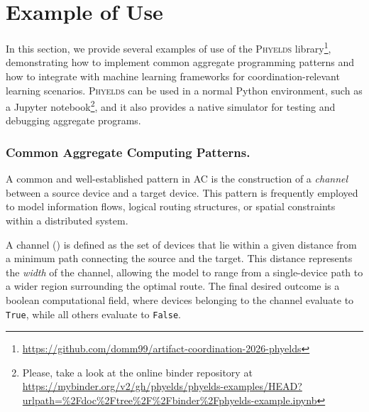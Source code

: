 \documentclass[runningheads]{llncs}
\begin{document}
\section{Example of Use}\label{sec:examples}

In this section, we provide several examples of use of the \textsc{Phyelds} library\footnote{\url{https://github.com/domm99/artifact-coordination-2026-phyelds}}, 
 demonstrating how to implement common aggregate programming patterns 
 and how to integrate with machine learning frameworks for coordination-relevant learning scenarios.
%
\textsc{Phyelds} can be used in a normal Python environment, 
 such as a Jupyter notebook\footnote{Please, take a look at the online binder repository at \url{https://mybinder.org/v2/gh/phyelds/phyelds-examples/HEAD?urlpath=\%2Fdoc\%2Ftree\%2F\%2Fbinder\%2Fphyelds-example.ipynb}}, 
 and it also provides a native simulator for testing and debugging aggregate programs.

\subsubsection{Common Aggregate Computing Patterns.}\label{sec:ac-patterns}

A common and well-established pattern in AC is the construction of a \emph{channel} 
 between a source device and a target device. 
% 
This pattern is frequently employed to model information flows, 
 logical routing structures, 
 or spatial constraints within a distributed system.

A channel () is defined as the set of devices that lie within 
 a given distance from a minimum path connecting the source and the target. 
% 
This distance represents the \emph{width} of the channel, 
 allowing the model to range from a single-device path 
 to a wider region surrounding the optimal route. 
% 
The final desired outcome is a boolean computational field, 
 where devices belonging to the channel evaluate to \texttt{True}, 
 while all others evaluate to \texttt{False}.
\end{document}
